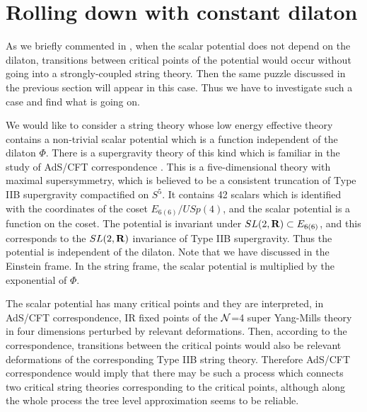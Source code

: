 \documentclass[a4paper,a4paper]{article}
\begin{document}
\vspace{1cm}

\section{Rolling down with constant dilaton}  \label{Dindep}

\vspace{5mm}

As we briefly commented in \cite{suyama}, when the scalar potential does not depend on the dilaton, transitions 
between critical points of the potential would occur without going into a strongly-coupled string theory. 
Then the same puzzle discussed in the previous section will appear in this case.  
Thus we have to investigate such a case and find what is going on. 

We would like to consider a string theory whose low energy effective theory contains a non-trivial scalar 
potential which is a function independent of the dilaton $\Phi$. 
There is a supergravity theory of this kind \cite{5dim1}\cite{5dim2} which is familiar in the study of AdS/CFT 
correspondence \cite{AdS/CFT}. 
This is a five-dimensional theory with maximal supersymmetry, which is believed to be a consistent truncation of 
Type IIB supergravity compactified on $S^5$. 
It contains 42 scalars which is identified with the coordinates of the coset $E_{6(6)}/USp(4)$, and the scalar 
potential is a function on the coset. 
The potential is invariant under $SL(2,{\bf R})\subset E_{6(6)}$, and this corresponds to the 
$SL(2,{\bf R})$ invariance of Type IIB supergravity. 
Thus the potential is independent of the dilaton. 
Note that we have discussed in the Einstein frame. 
In the string frame, the scalar potential is multiplied by the exponential of $\Phi$. 

The scalar potential has many critical points \cite{5dim1}\cite{critical1}\cite{critical2}\cite{critical3} 
and they are interpreted, in AdS/CFT correspondence, IR fixed 
points of the ${\cal N}$=4 super Yang-Mills theory in four dimensions perturbed by relevant deformations. 
Then, according to the correspondence, transitions between the critical points would also be relevant 
deformations of the corresponding Type IIB string theory. 
Therefore AdS/CFT correspondence would imply that there may be such a process which connects two critical string 
theories corresponding to the critical points, although along the whole process the tree level approximation 
seems to be reliable. 

\vspace{3mm}
\end{document}
